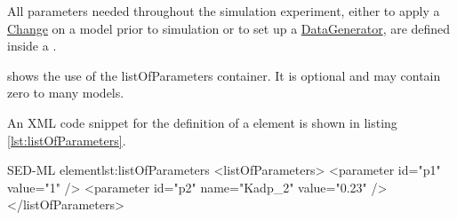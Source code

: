 \label{sec:listOfParameters}
All parameters needed throughout the simulation experiment, either to apply a \hyperref[class:change]{Change} on a model prior to simulation or to set up a \hyperref[class:dataGenerator]{DataGenerator},  are defined inside a .

 shows the use of the listOfParameters container. It is optional and may contain zero to many models.
%

An XML code snippet for the definition of a  element is shown in listing \ref{lst:listOfParameters}.
%
\begin{myXmlLst}{SED-ML  element}{lst:listOfParameters}
<listOfParameters>
 <parameter id="p1" value="1" />
 <parameter id="p2" name="Kadp_2" value="0.23" />
</listOfParameters>
\end{myXmlLst}
%


